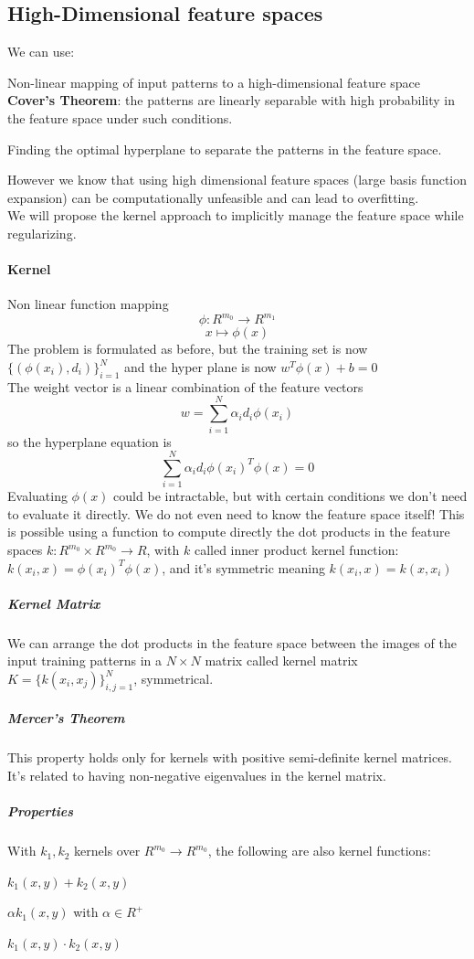 \documentclass[10pt]{report}
\begin{document}
\subsection{High-Dimensional feature spaces} We can use:
\begin{list}{}{}
	\item Non-linear mapping of input patterns to a high-dimensional feature space\\
	\textbf{Cover's Theorem}: the patterns are linearly separable with high probability in the feature space under such conditions.
	\item Finding the optimal hyperplane to separate the patterns in the feature space.
\end{list}
However we know that using high dimensional feature spaces (large basis function expansion) can be computationally unfeasible and can lead to overfitting.\\
We will propose the kernel approach to implicitly manage the feature space while regularizing.
\paragraph{Kernel} Non linear function mapping $$\phi:R^{m_0}\rightarrow R^{m_1}$$ $$x\mapsto \phi(x)$$
The problem is formulated as before, but the training set is now $\{(\phi(x_i), d_i)\}_{i=1}^N$ and the hyper plane is now $w^T\phi(x) + b = 0$\\
The weight vector is a linear combination of the feature vectors
$$w=\sum_{i=1}^N\alpha_id_i\phi(x_i)$$ so the hyperplane equation is $$\sum_{i=1}^N\alpha_id_i\phi(x_i)^T\phi(x) = 0$$
Evaluating $\phi(x)$ could be intractable, but with certain conditions we don't need to evaluate it directly. We do not even need to know the feature space itself! This is possible using a function to compute directly the dot products in the feature spaces $k:R^{m_0}\times R^{m_0}\rightarrow R$, with $k$ called inner product kernel function: $k(x_i, x) = \phi(x_i)^T\phi(x)$, and it's symmetric meaning $k(x_i, x) = k(x, x_i)$\\
\subparagraph{Kernel Matrix} We can arrange the dot products in the feature space between the images of the input training patterns in a $N\times N$ matrix called kernel matrix $K = \{k(x_i, x_j)\}_{i,j=1}^N$, symmetrical.
\subparagraph{Mercer's Theorem} This property holds only for kernels with positive semi-definite kernel matrices. It's related to having non-negative eigenvalues in the kernel matrix.
\subparagraph{Properties} With $k_1,k_2$ kernels over $R^{m_0}\rightarrow R^{m_0}$, the following are also kernel functions:
\begin{list}{}{}
	\item $k_1(x,y)+k_2(x,y)$
	\item $\alpha k_1(x,y)$ with $\alpha\in R^+$
	\item $k_1(x,y)\cdot k_2(x,y)$
\end{list}
\end{document}
